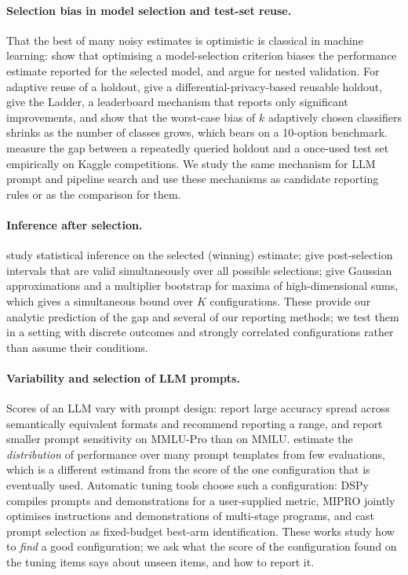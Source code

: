 \paragraph{Selection bias in model selection and test-set reuse.}
That the best of many noisy estimates is optimistic is classical in machine learning: \citet{cawley2010overfitting} show that optimising a model-selection criterion biases the performance estimate reported for the selected model, and argue for nested validation. For adaptive reuse of a holdout, \citet{dwork2015preserving} give a differential-privacy-based reusable holdout, \citet{blum2015ladder} give the Ladder, a leaderboard mechanism that reports only significant improvements, and \citet{feldman2019advantages} show that the worst-case bias of $k$ adaptively chosen classifiers shrinks as the number of classes grows, which bears on a 10-option benchmark. \citet{roelofs2019meta} measure the gap between a repeatedly queried holdout and a once-used test set empirically on Kaggle competitions. We study the same mechanism for LLM prompt and pipeline search and use these mechanisms as candidate reporting rules or as the comparison for them.

\paragraph{Inference after selection.}
\citet{andrews2024winners} study statistical inference on the selected (winning) estimate; \citet{berk2013valid} give post-selection intervals that are valid simultaneously over all possible selections; \citet{chernozhukov2013gaussian} give Gaussian approximations and a multiplier bootstrap for maxima of high-dimensional sums, which gives a simultaneous bound over $K$ configurations. These provide our analytic prediction of the gap and several of our reporting methods; we test them in a setting with discrete outcomes and strongly correlated configurations rather than assume their conditions.

\paragraph{Variability and selection of LLM prompts.}
Scores of an LLM vary with prompt design: \citet{sclar2024quantifying} report large accuracy spread across semantically equivalent formats and recommend reporting a range, and \citet{wang2024mmlupro} report smaller prompt sensitivity on MMLU-Pro than on MMLU. \citet{polo2024prompteval} estimate the \emph{distribution} of performance over many prompt templates from few evaluations, which is a different estimand from the score of the one configuration that is eventually used. Automatic tuning tools choose such a configuration: DSPy \citep{khattab2023dspy} compiles prompts and demonstrations for a user-supplied metric, MIPRO \citep{opsahlong2024mipro} jointly optimises instructions and demonstrations of multi-stage programs, and \citet{shi2024triple} cast prompt selection as fixed-budget best-arm identification. These works study how to \emph{find} a good configuration; we ask what the score of the configuration found on the tuning items says about unseen items, and how to report it.
